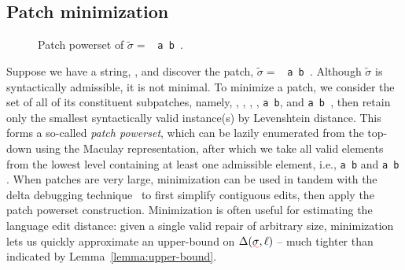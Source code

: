 \documentclass[sigplan,review,anonymous,acmsmall]{acmart}\settopmatter{printfolios=false,printccs=false,printacmref=false}
\begin{document}
\subsection{Patch minimization}\label{sec:minimization}

\begin{figure}
  \vspace{-14pt}
  \caption{Patch powerset of $\tilde{\sigma}=$ \texttt{\hlgreen{(} a \hlorange{+} b \hlgreen{)}}.}
\end{figure}

Suppose we have a string, \texttt{}, and discover the patch, $\tilde{\sigma}=$ \texttt{\hlgreen{(} a \hlorange{+} b \hlgreen{)}}. Although $\tilde{\sigma}$ is syntactically admissible, it is not minimal. To minimize a patch, we consider the set of all of its constituent subpatches, namely, \texttt{}, \texttt{}, \texttt{}, \texttt{}, \texttt{a \hlorange{+} b}, and \texttt{a \hlgreen{(} b \hlgreen{)}}, then retain only the smallest syntactically valid instance(s) by Levenshtein distance. This forms a so-called \textit{patch powerset}, which can be lazily enumerated from the top-down using the Maculay representation, after which we take all valid elements from the lowest level containing at least one admissible element, i.e., \texttt{a \hlorange{+} b} and \texttt{a \hlgreen{(} b \hlgreen{)}}. When patches are very large, minimization can be used in tandem with the delta debugging technique~\cite{zeller2002isolating} to first simplify contiguous edits, then apply the patch powerset construction. Minimization is often useful for estimating the language edit distance: given a single valid repair of arbitrary size, minimization lets us quickly approximate an upper-bound on $\Delta(\err{\sigma}, \ell)$ -- much tighter than indicated by Lemma~\ref{lemma:upper-bound}.
\end{document}
